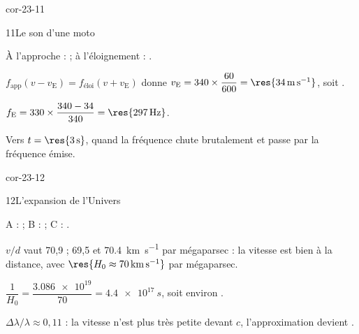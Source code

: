 \begin{blocLivre}{cor-23-11}
\begin{corrige}{11}{Le son d'une moto}
\begin{questions}
\item À l'approche :  ; à l'éloignement : .
\item $f_\text{app}(v-v_\mathrm{E})=f_\text{éloi}(v+v_\mathrm{E})$ donne $v_\mathrm{E}=340\times\dfrac{60}{600}=\res{\qty{34}{m.s^{-1}}}$, soit
.
\item $f_\mathrm{E}=330\times\dfrac{340-34}{340}=\res{\qty{297}{Hz}}$.
\item Vers $t=\res{\qty{3}{s}}$, quand la fréquence chute brutalement et passe par la fréquence émise.
\end{questions}
\end{corrige}
\end{blocLivre}
\begin{blocLivre}{cor-23-12}
\begin{corrige}{12}{L'expansion de l'Univers}
\begin{questions}
\item A :  ; B :  ; C : .
\item $v/d$ vaut 70,9 ; 69,5 et \qty{70,4}{km.s^{-1}} par mégaparsec : la vitesse est bien  à la distance,
avec $\res{H_0\approx\qty{70}{km.s^{-1}}}$ par mégaparsec.
\item $\dfrac{1}{H_0}=\dfrac{\num{3.086e19}}{70}=\qty{4,4e17}{s}$, soit environ .
\item $\Delta\lambda/\lambda\approx0{,}11$ : la vitesse n'est plus très petite devant $c$, l'approximation devient
.
\end{questions}
\end{corrige}
\end{blocLivre}
